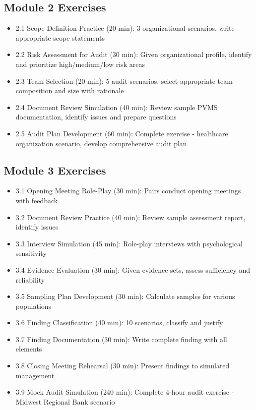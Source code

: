 \documentclass[11pt,a4paper]{article}
\begin{document}
\subsection{Module 2 Exercises}
\begin{itemize}
\item 2.1 Scope Definition Practice (20 min): 3 organizational scenarios, write appropriate scope statements
\item 2.2 Risk Assessment for Audit (30 min): Given organizational profile, identify and prioritize high/medium/low risk areas
\item 2.3 Team Selection (20 min): 5 audit scenarios, select appropriate team composition and size with rationale
\item 2.4 Document Review Simulation (40 min): Review sample PVMS documentation, identify issues and prepare questions
\item 2.5 Audit Plan Development (60 min): Complete exercise - healthcare organization scenario, develop comprehensive audit plan
\end{itemize}

\subsection{Module 3 Exercises}
\begin{itemize}
\item 3.1 Opening Meeting Role-Play (30 min): Pairs conduct opening meetings with feedback
\item 3.2 Document Review Practice (40 min): Review sample assessment report, identify issues
\item 3.3 Interview Simulation (45 min): Role-play interviews with psychological sensitivity
\item 3.4 Evidence Evaluation (30 min): Given evidence sets, assess sufficiency and reliability
\item 3.5 Sampling Plan Development (30 min): Calculate samples for various populations
\item 3.6 Finding Classification (40 min): 10 scenarios, classify and justify
\item 3.7 Finding Documentation (30 min): Write complete finding with all elements
\item 3.8 Closing Meeting Rehearsal (30 min): Present findings to simulated management
\item 3.9 Mock Audit Simulation (240 min): Complete 4-hour audit exercise - Midwest Regional Bank scenario
\end{itemize}
\end{document}
